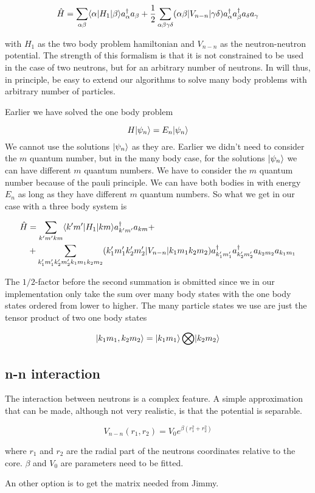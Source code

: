 \begin{equation}
\hat{H} =
\sum_{\alpha \beta} \bra{\alpha} H_1 \ket{\beta} a_{\alpha}^{\dagger} a_{\beta} + \frac{1}{2}\sum_{\alpha \beta \gamma \delta} ( \alpha \beta| V_{n-n} | \gamma \delta ) a_{\alpha}^{\dagger} a_{\beta}^{\dagger} a_{\delta} a_{\gamma}
\end{equation}

with $H_1$ as the two body problem hamiltonian and $V_{n-n}$ as the neutron-neutron potential. The strength of this formalism is that it is not constrained to be used in the case of two neutrons, but for an arbitrary number of neutrons. In will thus, in principle, be easy to extend our algorithms to solve many body problems with arbitrary number of particles. 

Earlier we have solved the one body problem

\begin{equation}
H \ket{\psi_n} = E_n \ket{\psi_n}
\end{equation}
We cannot use the solutions $\ket{\psi_n}$ as they are. Earlier we didn't need to consider the $m$ quantum number, but in the many body case, for the solutions $\ket{\psi_n}$ we can have different $m$ quantum numbers. We have to consider the $m$ quantum number because of the pauli principle. We can have both bodies in with energy $E_n$ as long as they have different $m$ quantum numbers. So what we get in our case with a three body system is

\begin{align}
\hat{H} &= \sum_{k' m' k m } \bra{k'm'} H_1 \ket{km} a_{k'm'}^{\dagger} a_{km} + \\
& + \sum_{k_1' m_1' k_2' m_2' k_1 m_1 k_2 m_2} ( k_1' m_1' k_2' m_2'| V_{n-n} | k_1 m_1 k_2 m_2 ) a_{k_1' m_1'}^{\dagger} a_{k_2' m_2'}^{\dagger} a_{k_2 m_2} a_{k_1 m_1}\label{two-body op sum}
\end{align}

The $1/2$-factor before the second summation is obmitted since we in our implementation only take the sum over many body states with the one body states ordered from lower to higher. The many particle states we use are just the tensor product of two one body states

\begin{equation}
\ket{k_1 m_1 , k_2 m_2 } = \ket{k_1 m_1} \bigotimes \ket{k_2 m_2}
\end{equation}

\subsection{n-n interaction}
The interaction between neutrons is a complex feature. A simple approximation that can be made, although not very realistic, is that the potential is separable. 

\begin{equation}
V_{n-n}(r_{1} , r_{2}) = V_{0}e^{ \beta (r_1^2 + r_2^2)}
\end{equation}

where $r_1$ and $r_2$ are the radial part of the neutrons coordinates relative to the core. $\beta$ and $V_{0}$ are parameters need to be fitted. 

An other option is to get the matrix needed from Jimmy.
